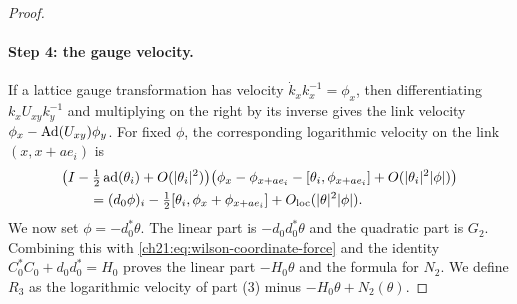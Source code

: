 \begin{proof}
\paragraph{Step 4: the gauge velocity.}
If a lattice gauge transformation has velocity $\dot k_xk_x^{-1}=\phi_x$, then differentiating $k_xU_{xy}k_y^{-1}$ and multiplying on the right by its inverse gives the link velocity $\phi_x-\operatorname{Ad}(U_{xy})\phi_y$. For fixed $\phi$, the corresponding logarithmic velocity on the link $(x,x+ae_i)$ is
\[
 \begin{split}
 &\bigl(I-\tfrac12\operatorname{ad}(\theta_i)+O(\lvert \theta_i\rvert^2)\bigr)\bigl(\phi_x-\phi_{x+ae_i}-[\theta_i,\phi_{x+ae_i}]+O(\lvert \theta_i\rvert^2\lvert \phi\rvert)\bigr)\\
 &\qquad=(d_0\phi)_i-\tfrac12[\theta_i,\phi_x+\phi_{x+ae_i}]+O_{\mathrm{loc}}(\lvert \theta\rvert^2\lvert \phi\rvert).
 \end{split}
\]
We now set $\phi=-d_0^*\theta$. The linear part is $-d_0d_0^*\theta$ and the quadratic part is $G_2$. Combining this with \eqref{ch21:eq:wilson-coordinate-force} and the identity $C_0^*C_0+d_0d_0^*=H_0$ proves the linear part $-H_0\theta$ and the formula for $N_2$. We define $R_3$ as the logarithmic velocity of part (3) minus $-H_0\theta+N_2(\theta)$.


\end{proof}

